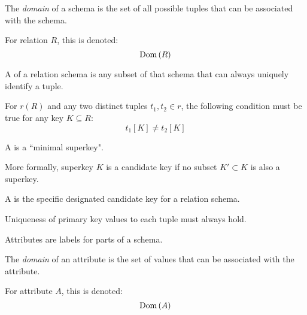 \begin{multicols}{2}
\begin{CheatsheetEntryFrame}
        The \textit{domain} of a schema is the set of all possible tuples that can be associated with the schema.

        For relation $R$, this is denoted:
        \begin{equation*}
            \operatorname{Dom}{(R)}
        \end{equation*}



        A \textit{} of a relation schema is any subset of that schema that can always uniquely identify a tuple.

        For $r(R)$ and any two distinct tuples $t_1, t_2 \in r$, the following condition must be true for any key $K \subseteq R$:
        \begin{equation*}
            t_1[K] \neq t_2[K]
        \end{equation*}

        A \textit{} is a ``minimal superkey".

        More formally, superkey $K$ is a candidate key if no subset $K' \subset K$ is also a superkey.

        A \textit{} is the specific designated candidate key for a relation schema.
        
        Uniqueness of primary key values to each tuple must always hold.

    \end{CheatsheetEntryFrame}

    \begin{CheatsheetEntryFrame}


        Attributes are labels for parts of a schema.

        The \textit{domain} of an attribute is the set of values that can be associated with the attribute.

        For attribute $A$, this is denoted:
        \begin{equation*}
            \operatorname{Dom}{(A)}
        \end{equation*}

    \end{CheatsheetEntryFrame}



\end{multicols}
